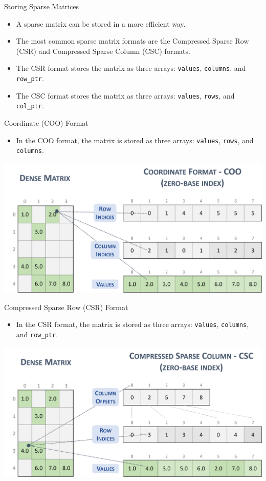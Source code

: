 \documentclass{beamer}
\begin{document}
\begin{frame}{Storing Sparse Matrices}
    \begin{itemize}
        \item A sparse matrix can be stored in a more efficient way.
        \item The most common sparse matrix formats are the Compressed Sparse Row (CSR) and Compressed Sparse Column (CSC) formats.
        \item The CSR format stores the matrix as three arrays: \texttt{values}, \texttt{columns}, and \texttt{row\_ptr}.
        \item The CSC format stores the matrix as three arrays: \texttt{values}, \texttt{rows}, and \texttt{col\_ptr}.
    \end{itemize}
\end{frame}
\begin{frame}{Coordinate (COO) Format}
    \begin{itemize}
        \item In the COO format, the matrix is stored as three arrays: \texttt{values}, \texttt{rows}, and \texttt{columns}.
    \end{itemize}
    \centerline{\includegraphics[width=\textwidth]{coo.png}}

\end{frame}
\begin{frame}{Compressed Sparse Row (CSR) Format}
    \begin{itemize}
        \item In the CSR format, the matrix is stored as three arrays: \texttt{values}, \texttt{columns}, and \texttt{row\_ptr}.
     
    \end{itemize}
    \centerline{ \includegraphics[width=\textwidth]{csc.png}}
\end{frame}
\end{document}
